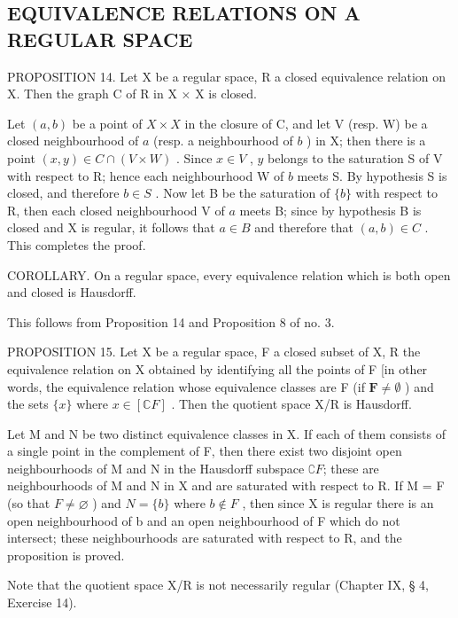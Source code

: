 \subsection{EQUIVALENCE RELATIONS ON A REGULAR SPACE}

PROPOSITION 14. Let X be a regular space, R a closed equivalence relation on X. Then the graph C of R in X × X is closed.

Let \((a, b)\) be a point of \(X \times X\) in the closure of C, and let V (resp. W) be a closed neighbourhood of \(a\) (resp. a neighbourhood of \(b\) ) in X; then there is a point \((x, y) \in C \cap (V \times W)\) . Since \(x \in V\) , \(y\) belongs to the saturation S of V with respect to R; hence each neighbourhood W of \(b\) meets S. By hypothesis S is closed, and therefore \(b \in S\) . Now let B be the saturation of \(\{b\}\) with respect to R, then each closed neighbourhood V of \(a\) meets B; since by hypothesis B is closed and X is regular, it follows that \(a \in B\) and therefore that \((a, b) \in C\) . This completes the proof.

COROLLARY. On a regular space, every equivalence relation which is both open and closed is Hausdorff.

This follows from Proposition 14 and Proposition 8 of no. 3.

PROPOSITION 15. Let X be a regular space, F a closed subset of X, R the equivalence relation on X obtained by identifying all the points of F {[}in other words, the equivalence relation whose equivalence classes are F (if \(\mathbf{F} \neq \emptyset\) ) and the sets \(\{x\}\) where \(x \in [\mathbb{C}F]\) . Then the quotient space X/R is Hausdorff.

Let M and N be two distinct equivalence classes in X. If each of them consists of a single point in the complement of F, then there exist two disjoint open neighbourhoods of M and N in the Hausdorff subspace \(\complement F\); these are neighbourhoods of M and N in X and are saturated with respect to R. If M = F (so that \(F \neq \varnothing\) ) and \(N = \{b\}\) where \(b \notin F\) , then since X is regular there is an open neighbourhood of b and an open neighbourhood of F which do not intersect; these neighbourhoods are saturated with respect to R, and the proposition is proved.

Note that the quotient space X/R is not necessarily regular (Chapter IX, § 4, Exercise 14).

